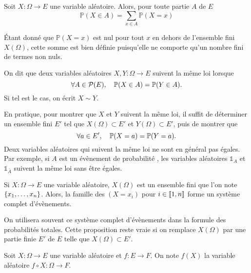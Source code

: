 \documentclass{magnolia}
\begin{document}
  
\begin{proposition}
Soit $X:\Omega\to E$ une variable aléatoire. Alors, pour toute partie $A$ de $E$
  \[\mathbb{P}(X\in A)=\sum_{x\in A} \mathbb{P}(X=x)\]
\end{proposition}

\begin{remarqueUnique}
\remarque Étant donné que $\mathbb{P}(X=x)$ est nul pour tout $x$ en dehors de l'ensemble
  fini $X(\Omega)$, cette somme est bien définie puisqu'elle ne comporte qu'un nombre fini
  de termes non nuls.
\end{remarqueUnique}


\begin{definition}
On dit que deux variables aléatoires $X,Y:\Omega\to E$ suivent la même
loi lorsque
\[\forall A\in\mathcal{P}(E),\quad \mathbb{P}(X\in A)=\mathbb{P}(Y\in A).\]
Si tel est le cas, on écrit $X\sim Y$.
\end{definition}

\begin{remarques}
\remarque En pratique, pour montrer que $X$ et $Y$ suivent la même loi, il suffit de déterminer
  un ensemble fini $E'$ tel que $X(\Omega)\subset E'$ et $Y(\Omega)\subset E'$, puis de
  montrer que
  \[\forall a\in E',\quad \mathbb{P}(X=a)=\mathbb{P}(Y=a).\]
\remarque Deux variables aléatoires qui suivent la même loi ne sont en général pas égales.
  Par exemple, si $A$ est un évènement de probabilité , les variables
  aléatoires $\mathds{1}_A$ et $\mathds{1}_{\bar{A}}$ suivent la même loi sans être
  égales.
\end{remarques}

\begin{proposition}
Si $X:\Omega\to E$ une variable aléatoire, $X(\Omega)$ est un ensemble fini que l'on
note $\left\{x_1,\ldots,x_n\right\}$. Alors, la famille des $(X=x_i)$ pour $i\in\left\llbracket 1,n\right\rrbracket$ forme
un système complet d'évènements.
\end{proposition}

\begin{remarques}
\remarque On utilisera souvent ce système complet d'évènements dans la formule des
  probabilités totales.
\remarque Cette proposition reste vraie si on remplace $X(\Omega)$ par une partie finie
  $E'$ de $E$ telle que $X(\Omega)\subset E'$.
\end{remarques}


\begin{definition}
Soit $X:\Omega\to E$ une variable aléatoire et $f:E\to F$. On note $f(X)$ la variable
aléatoire $f\circ X:\Omega\to F$.
\end{definition}
\end{document}

